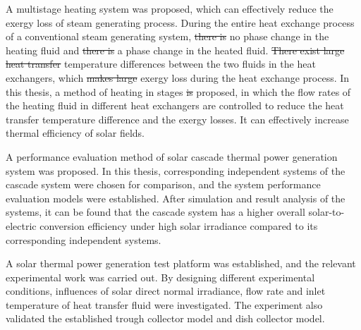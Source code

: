 {A multistage heating system was proposed, which can effectively reduce the exergy loss of steam generating process. During the entire heat exchange process of a conventional steam generating system, {\color{red}\sout{there is}} no phase change {\color{red}} in the heating fluid and {\color{red}\sout{there is}} a phase change {\color{red}} in the heated fluid. {\color{red}\sout{There exist large heat transfer}} temperature differences {\color{red}} between the two fluids in the heat exchangers, which {\color{red}\sout{makes large}} exergy loss during the heat exchange process. In this thesis, a method of heating in stages {\color{red}\sout{is}} proposed, in which the flow rates of the heating fluid in different heat exchangers are controlled to reduce the heat transfer temperature difference and the exergy losses. It can effectively increase thermal efficiency of solar fields.

A performance evaluation method of solar cascade thermal power generation system was proposed. In this thesis, corresponding independent systems of the cascade system were chosen for comparison, and the system performance evaluation models were established. After simulation and result analysis of the systems, it can be found that the cascade system has a higher overall solar-to-electric conversion efficiency under high solar irradiance compared to its corresponding independent systems.

A solar thermal power generation test platform was established, and the relevant experimental work was carried out. By designing different experimental conditions, influences of solar direct normal irradiance, flow rate and inlet temperature of heat transfer fluid were investigated.
The experiment also validated the established trough collector model and dish collector model.


}
